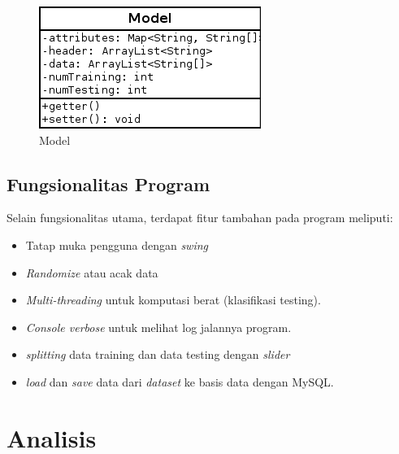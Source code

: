\documentclass[11pt,a4paper]{report}
\begin{document}
	\begin{figure}[h]
	\centering
	\includegraphics[width=0.5\linewidth]{model}
	\caption{Model}
	\label{fig:model}
	\end{figure}
	\newpage
	\section{Fungsionalitas Program}
	Selain fungsionalitas utama, terdapat fitur tambahan pada program meliputi:
	\begin{itemize}
		\item Tatap muka pengguna dengan \emph{swing}
		\item \emph{Randomize} atau acak data
		\item \emph{Multi-threading} untuk komputasi berat (klasifikasi testing).
		\item \emph{Console verbose} untuk melihat log jalannya program.
		\item \emph{splitting} data training dan data testing dengan \emph{slider}  
		\item \emph{load} dan \emph{save} data dari \emph{dataset} ke basis data dengan MySQL.
	\end{itemize}
	\chapter{Analisis}
\end{document}
